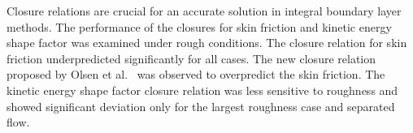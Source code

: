 Closure relations are crucial for an accurate solution in integral boundary layer methods. The performance of the closures for skin friction and kinetic energy shape factor was examined under rough conditions. The closure relation for skin friction underpredicted significantly for all cases. The new closure relation proposed by Olsen et al.~\cite{olsen2020improved} was observed to overpredict the skin friction. The kinetic energy shape factor closure relation was less sensitive to roughness and showed significant deviation only for the largest roughness case and separated flow. 